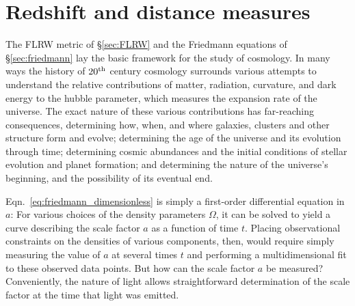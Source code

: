 \section{Redshift and distance measures}
\label{sec:redshift}
The FLRW metric of \S\ref{sec:FLRW} and the Friedmann equations of
\S\ref{sec:friedmann} lay the basic framework for the study of cosmology.
In many ways the history of $20^{\rm th}$ century cosmology surrounds various
attempts to understand the relative contributions of matter, radiation,
curvature, and dark energy to the hubble parameter, which measures
the expansion rate of the universe.  The exact nature of these various
contributions has far-reaching consequences,
determining how, when, and where galaxies, clusters and other structure
form and evolve; determining the age of the universe and its evolution
through time; determining cosmic abundances and 
the initial conditions of stellar evolution
and planet formation; and determining the nature of the universe's beginning,
and the possibility of its eventual end.

Eqn.~\ref{eq:friedmann_dimensionless} is simply a first-order differential
equation in $a$: For various choices of the density parameters $\Omega$, it
can be solved to yield a curve describing the scale factor $a$ as a function
of time $t$.  Placing observational constraints on the densities of
various components, then, would require simply measuring the value of $a$ at
several times $t$ and performing a multidimensional fit to these observed
data points.  But how can the scale factor $a$ be measured?
Conveniently, the nature of light allows straightforward determination
of the scale factor at the time that light was emitted.  

